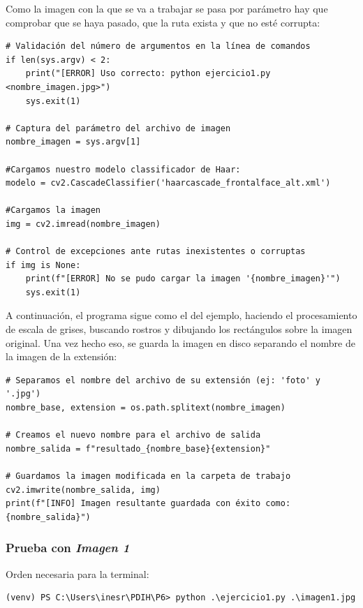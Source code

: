 Como la imagen con la que se va a trabajar se pasa por parámetro hay que comprobar que se haya pasado, que la ruta exista y que no esté corrupta:
\begin{lstlisting}[style=pythonstyle, caption={Comprobación de parametro}, label={lst:param1}]
# Validación del número de argumentos en la línea de comandos
if len(sys.argv) < 2:
    print("[ERROR] Uso correcto: python ejercicio1.py <nombre_imagen.jpg>")
    sys.exit(1)

# Captura del parámetro del archivo de imagen
nombre_imagen = sys.argv[1]

#Cargamos nuestro modelo classificador de Haar:
modelo = cv2.CascadeClassifier('haarcascade_frontalface_alt.xml')
  
#Cargamos la imagen
img = cv2.imread(nombre_imagen)

# Control de excepciones ante rutas inexistentes o corruptas
if img is None:
    print(f"[ERROR] No se pudo cargar la imagen '{nombre_imagen}'")
    sys.exit(1)    
\end{lstlisting}

A continuación, el programa sigue como el del ejemplo, haciendo el procesamiento de escala de grises, buscando rostros y dibujando los rectángulos sobre la imagen original. Una vez hecho eso, se guarda la imagen en disco separando el nombre de la imagen de la extensión:
\begin{lstlisting}[style=pythonstyle, caption={Guardar imagen}, label={lst:guardarimg1}]
# Separamos el nombre del archivo de su extensión (ej: 'foto' y '.jpg')
nombre_base, extension = os.path.splitext(nombre_imagen)

# Creamos el nuevo nombre para el archivo de salida
nombre_salida = f"resultado_{nombre_base}{extension}"

# Guardamos la imagen modificada en la carpeta de trabajo
cv2.imwrite(nombre_salida, img)
print(f"[INFO] Imagen resultante guardada con éxito como: {nombre_salida}")
\end{lstlisting}

\subsubsection{Prueba con \textit{Imagen 1}}
Orden necesaria para la terminal:
\begin{lstlisting}[style=terminalstyle, caption={Orden de ejecución - Imagen 1}, label={lst:ejecimg1}]
(venv) PS C:\Users\inesr\PDIH\P6> python .\ejercicio1.py .\imagen1.jpg  
\end{lstlisting}


